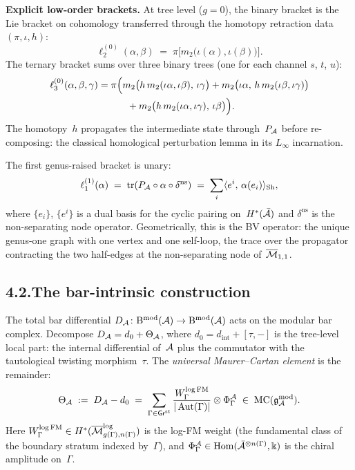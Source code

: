 \medskip

\noindent\textbf{Explicit low-order brackets.}\enspace
At tree level ($g=0$), the binary bracket is the Lie bracket on
cohomology transferred through the homotopy retraction data
$(\pi,\iota,h)$:
\[
\ell_2^{(0)}(\alpha,\beta)
\;=\;
\pi\bigl[m_2\bigl(\iota(\alpha),\iota(\beta)\bigr)\bigr].
\]
The ternary bracket sums over three binary trees (one for each
channel $s$, $t$, $u$):
\begin{align*}
\ell_3^{(0)}(\alpha,\beta,\gamma)
&=\pi\Bigl(
m_2\bigl(h\,m_2(\iota\alpha,\iota\beta),\,\iota\gamma\bigr)
+m_2\bigl(\iota\alpha,\,h\,m_2(\iota\beta,\iota\gamma)\bigr)\\
&\qquad\quad
+m_2\bigl(h\,m_2(\iota\alpha,\iota\gamma),\,\iota\beta\bigr)
\Bigr).
\end{align*}
The homotopy~$h$ propagates the intermediate state through~$P_{\mathcal{A}}$
before re-composing: the classical homological perturbation lemma
in its $L_\infty$ incarnation.

The first genus-raised bracket is unary:
\[
\ell_1^{(1)}(\alpha)
\;=\;
\operatorname{tr}(P_{\mathcal{A}}\circ\alpha\circ
\delta^{\mathrm{ns}})
\;=\;
\sum_{i}
\langle e^i,\,\alpha(e_i)\rangle_{\mathrm{Sh}},
\]
where $\{e_i\}$, $\{e^i\}$ is a dual basis for the cyclic pairing
on~$H^*(\bar{\mathcal{A}})$ and $\delta^{\mathrm{ns}}$ is the non-separating
node operator. Geometrically, this is the BV operator: the unique
genus-one graph with one vertex and one self-loop, the trace over the
propagator contracting the two half-edges at the non-separating node
of~$\overline{\mathcal{M}}_{1,1}$.

\subsection*{4.2.\enspace The bar-intrinsic construction}

The total bar differential
$D_{\mathcal{A}}\colon\mathrm{B}^{\mathrm{mod}}(\mathcal{A})\to
\mathrm{B}^{\mathrm{mod}}(\mathcal{A})$ acts on the modular bar complex.
Decompose $D_{\mathcal{A}}=d_0+\Theta_{\mathcal{A}}$, where
$d_0=d_{\mathrm{int}}+[\tau,-]$ is the tree-level local part: the
internal differential of~$\mathcal{A}$ plus the commutator with the
tautological twisting morphism~$\tau$. The \emph{universal
Maurer--Cartan element} is the remainder:
\begin{equation}\label{eq:pref-theta}
\Theta_{\mathcal{A}}
\;:=\;
D_{\mathcal{A}}-d_0
\;=\;
\sum_{\Gamma\in\mathsf{Gr}^{\mathrm{st}}}
\frac{W^{\log\mathrm{FM}}_\Gamma}{|\operatorname{Aut}(\Gamma)|}
\otimes\Phi^{\mathcal{A}}_\Gamma
\;\in\;
\operatorname{MC}(\mathfrak{g}_{\mathcal{A}}^{\mathrm{mod}}).
\end{equation}
Here $W^{\log\mathrm{FM}}_\Gamma\in
H^*(\overline{\mathcal{M}}^{\log}_{g(\Gamma),n(\Gamma)})$ is the log-FM
weight (the fundamental class of the boundary stratum indexed
by~$\Gamma$), and
$\Phi^{\mathcal{A}}_\Gamma\in\operatorname{Hom}(\bar{\mathcal{A}}^{\otimes
n(\Gamma)},\Bbbk)$ is the chiral amplitude on~$\Gamma$.


